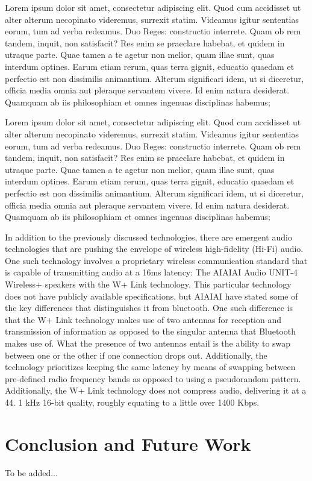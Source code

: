 \documentclass[conference]{IEEEtran}
\begin{document}
Lorem ipsum dolor sit amet, consectetur adipiscing elit. Quod cum accidisset ut alter alterum
necopinato videremus, surrexit statim. Videamus igitur sententias eorum, tum ad verba
redeamus. Duo Reges: constructio interrete. Quam ob rem tandem, inquit, non satisfacit? Res
enim se praeclare habebat, et quidem in utraque parte. Quae tamen a te agetur non melior,
quam illae sunt, quas interdum optines. Earum etiam rerum, quas terra gignit, educatio
quaedam et perfectio est non dissimilis animantium. Alterum significari idem, ut si
diceretur, officia media omnia aut pleraque servantem vivere. Id enim natura desiderat.
Quamquam ab iis philosophiam et omnes ingenuas disciplinas habemus;

Lorem ipsum dolor sit amet, consectetur adipiscing elit. Quod cum accidisset ut alter alterum
necopinato videremus, surrexit statim. Videamus igitur sententias eorum, tum ad verba
redeamus. Duo Reges: constructio interrete. Quam ob rem tandem, inquit, non satisfacit? Res
enim se praeclare habebat, et quidem in utraque parte. Quae tamen a te agetur non melior,
quam illae sunt, quas interdum optines. Earum etiam rerum, quas terra gignit, educatio
quaedam et perfectio est non dissimilis animantium. Alterum significari idem, ut si
diceretur, officia media omnia aut pleraque servantem vivere. Id enim natura desiderat.
Quamquam ab iis philosophiam et omnes ingenuas disciplinas habemus;

In addition to the previously discussed technologies, there are emergent audio technologies
that are pushing the envelope of wireless high-fidelity (Hi-Fi) audio. One such technology
involves a proprietary wireless communication standard that is capable of transmitting audio
at a 16ms latency: The AIAIAI Audio UNIT-4 Wireless+ speakers with the W+ Link technology.
This particular technology does not have publicly available specifications, but AIAIAI have
stated some of the key differences that distinguishes it from bluetooth. One such difference
is that the W+ Link technology makes use of two antennas for reception and transmission of
information as opposed to the singular antenna that Bluetooth makes use of. What the presence
of two antennas entail is the ability to swap between one or the other if one connection
drops out. Additionally, the technology prioritizes keeping the same latency by means of
swapping between pre-defined radio frequency bands as opposed to using a pseudorandom
pattern. Additionally, the W+ Link technology does not compress audio, delivering it at a 44.
1 kHz 16-bit quality, roughly equating to a little over 1400 Kbps.\cite{noauthor_unit-4_2023}

\section*{Conclusion and Future Work}

To be added...




\vspace{12pt}
\end{document}
